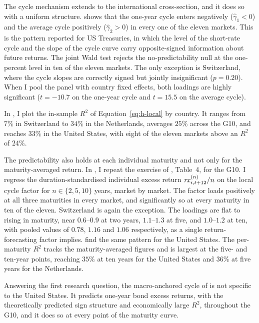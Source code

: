 \begin{table}[t]
  \caption{Phase~I: local cycle-factor predictability across the G10}
  \label{tab:mr-phase1}
  \centering
  
\end{table}


The cycle mechanism extends to the international cross-section, and
it does so with a uniform structure.  shows that the
one-year cycle enters negatively ($\hat\gamma_{1}<0$) and the average
cycle positively ($\hat\gamma_{2}>0$) in every one of the eleven markets. This is
the pattern reported for US Treasuries, in which the level of the short-rate cycle and the slope of the cycle
curve carry opposite-signed information about future returns. The joint Wald
test rejects the no-predictability null at the one-percent level in ten of
the eleven markets. The only exception is
Switzerland, where the cycle slopes are correctly signed but jointly
insignificant ($p=0.20$). When I pool the panel with country fixed effects,
both loadings are highly significant ($t=-10.7$ on the one-year cycle and
$t=15.5$ on the average cycle).

In
, I plot the in-sample $R^{2}$ of Equation~\eqref{eq:h-local} by
country. It ranges from $7\%$ in Switzerland to $34\%$ in the
Netherlands, averages $25\%$ across the G10, and reaches $33\%$ in the United
States, with eight of the
eleven markets above an $R^{2}$ of $24\%$.

The predictability also holds at each individual maturity
and not only for the maturity-averaged return. In , I
repeat the exercise of \citet{cieslak2015}, Table~4, for the G10. I regress the
duration-standardised individual excess return $\mathit{rx}^{(n)}_{i,t+12}/n$ on the
local cycle factor for $n\in\{2,5,10\}$ years, market by market. The factor
loads positively at all three maturities in every market, and significantly so
at every maturity in ten of the eleven. Switzerland is again the exception. The loadings are flat to
rising in maturity, near $0.6$--$0.9$ at two years, $1.1$--$1.3$ at five, and
$1.0$--$1.2$ at ten, with pooled values of $0.78$, $1.16$ and $1.06$
respectively, as a single return-forecasting factor implies.
\citet{cieslak2015} find the same pattern for the United States. The per-maturity $R^{2}$
tracks the maturity-averaged figures and
is largest at the five- and ten-year points, reaching $35\%$ at ten years for
the United States and $36\%$ at five years for the Netherlands.

Answering the first research question, the
macro-anchored cycle of \citet{cieslak2015} is not specific to the United
States. It predicts one-year bond excess returns, with the theoretically
predicted sign structure and economically large $R^{2}$, throughout the G10, and
it does so at every point of the maturity curve.

